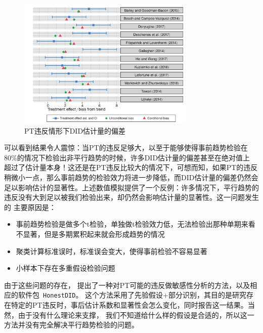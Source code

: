 \documentclass[../didNotes.tex]{subfiles}
\begin{document}
\begin{figure}[htbp]
  \begin{center}
    \includegraphics[width=0.75\textwidth]{./assets/PT_caution.png}
  \end{center}
  \caption{PT违反情形下DID估计量的偏差}
  \label{pic:PT_bias}
\end{figure}

可以看到结果令人震惊：当PT的违反足够大，以至于能够使得事前趋势检验在80\%的情况下检验出非平行趋势的时候，许多DID估计量的偏差甚至在绝对值上
超过了估计量本身！这还是在PT违反比较大的情况下，可想而知，如果PT的违反稍微小一点，那么事前趋势的检验效力将进一步降低，而DID估计量的偏差仍然会
足以影响估计的显著性。上述数值模拟提供了一个反例：许多情况下，平行趋势的违反没有大到足以被我们检验出来，却仍然会影响估计量的显著性。这一问题发生的
主要原因是：
\begin{itemize}
  \item 事前趋势检验是做多个t检验，单独做t检验效力低，无法检验出那种单期来看不显著，但是多期累积起来就会形成趋势的情况
  \item 聚类计算标准误时，标准误会变大，使得事前检验不容易显著
  \item 小样本下存在多重假设检验问题
\end{itemize}

由于这些问题的存在，\textcite{rambachan2023} 提出了一种对PT可能的违反做敏感性分析的方法，以及相应的软件包~\texttt{HonestDID}。
这个方法采用了先验假设+部分识别，其目的是研究存在特定的PT违反时，事后估计系数和显著性会怎么变化，同时报告这一结果。当然，由于没有什么理论来支撑，
我们不知道给什么样的假设是合适的，所以这一方法并没有完全解决平行趋势检验的问题。
\end{document}
